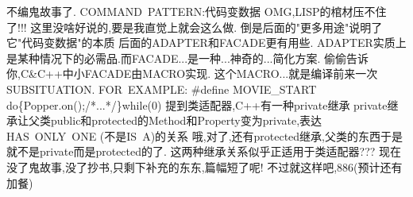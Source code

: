 \documentclass{ctexart}
\def\enter{{\hfill\break}}
\begin{document}
不编鬼故事了.\enter
COMMAND\ PATTERN:代码变数据\enter
OMG,LISP的棺材压不住了!!!\enter
这里没啥好说的,要是我直觉上就会这么做.\enter
倒是后面的"更多用途"说明了它"代码变数据"的本质\enter
\enter
后面的ADAPTER和FACADE更有用些.\enter
ADAPTER实质上是某种情况下的必需品.而FACADE...是一种...神奇的...简化方案.\enter
\enter
偷偷告诉你,C\&C++中小FACADE由MACRO实现.\enter
这个MACRO...就是编译前来一次SUBSITUATION.\enter
FOR\ EXAMPLE:\enter
{\#define MOVIE\_START do\{Popper.on();/*...*/\}while(0)}\enter
\enter
提到类适配器,C++有一种private继承\enter
private继承让父类public和protected的Method和Property变为private,表达HAS\ ONLY\ ONE  (不是IS\ A)的关系\enter
哦,对了,还有protected继承,父类的东西于是就不是private而是protected的了.\enter
这两种继承关系似乎正适用于类适配器???\enter
现在没了鬼故事,没了抄书,只剩下补充的东东,篇幅短了呢!\enter
不过就这样吧,886(预计还有加餐)\enter
\end{document}
